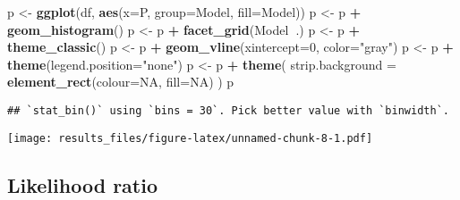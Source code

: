 \documentclass[]{article}
\newenvironment{Shaded}{\begin{snugshade}}{\end{snugshade}}
\newcommand{\DataTypeTok}[1]{\textcolor[rgb]{0.13,0.29,0.53}{#1}}
\newcommand{\DecValTok}[1]{\textcolor[rgb]{0.00,0.00,0.81}{#1}}
\newcommand{\KeywordTok}[1]{\textcolor[rgb]{0.13,0.29,0.53}{\textbf{#1}}}
\newcommand{\NormalTok}[1]{#1}
\newcommand{\OperatorTok}[1]{\textcolor[rgb]{0.81,0.36,0.00}{\textbf{#1}}}
\newcommand{\OtherTok}[1]{\textcolor[rgb]{0.56,0.35,0.01}{#1}}
\newcommand{\StringTok}[1]{\textcolor[rgb]{0.31,0.60,0.02}{#1}}
\begin{document}
\begin{Shaded}
\begin{Highlighting}[]
\NormalTok{p <-}\StringTok{ }\KeywordTok{ggplot}\NormalTok{(df, }\KeywordTok{aes}\NormalTok{(}\DataTypeTok{x=}\NormalTok{P, }\DataTypeTok{group=}\NormalTok{Model, }\DataTypeTok{fill=}\NormalTok{Model))}
\NormalTok{p <-}\StringTok{ }\NormalTok{p }\OperatorTok{+}\StringTok{ }\KeywordTok{geom_histogram}\NormalTok{()}
\NormalTok{p <-}\StringTok{ }\NormalTok{p }\OperatorTok{+}\StringTok{ }\KeywordTok{facet_grid}\NormalTok{(Model}\OperatorTok{~}\NormalTok{.)}
\NormalTok{p <-}\StringTok{ }\NormalTok{p }\OperatorTok{+}\StringTok{ }\KeywordTok{theme_classic}\NormalTok{()}
\NormalTok{p <-}\StringTok{ }\NormalTok{p }\OperatorTok{+}\StringTok{ }\KeywordTok{geom_vline}\NormalTok{(}\DataTypeTok{xintercept=}\DecValTok{0}\NormalTok{, }\DataTypeTok{color=}\StringTok{"gray"}\NormalTok{)}
\NormalTok{p <-}\StringTok{ }\NormalTok{p }\OperatorTok{+}\StringTok{ }\KeywordTok{theme}\NormalTok{(}\DataTypeTok{legend.position=}\StringTok{"none"}\NormalTok{)}
\NormalTok{p <-}\StringTok{ }\NormalTok{p }\OperatorTok{+}\StringTok{ }\KeywordTok{theme}\NormalTok{(}
      \DataTypeTok{strip.background =} \KeywordTok{element_rect}\NormalTok{(}\DataTypeTok{colour=}\OtherTok{NA}\NormalTok{, }\DataTypeTok{fill=}\OtherTok{NA}\NormalTok{)}
\NormalTok{)}
\NormalTok{p}
\end{Highlighting}
\end{Shaded}

\begin{verbatim}
## `stat_bin()` using `bins = 30`. Pick better value with `binwidth`.
\end{verbatim}

\texttt{[image: results\_files/figure-latex/unnamed-chunk-8-1.pdf]}

\hypertarget{likelihood-ratio}{%
\subsection{Likelihood ratio}\label{likelihood-ratio}}
\end{document}
